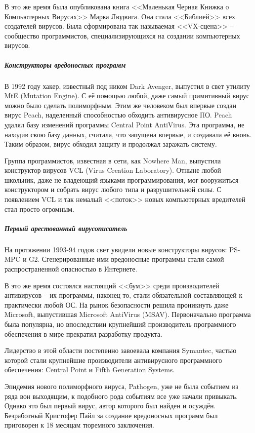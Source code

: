 В это же время была опубликована книга <<Маленькая Черная Книжка о
Компьютерных Вирусах>> Марка Людвига. Она стала <<Библией>> всех создателей
вирусов. Была сформирована так называемая <<VX-сцена>> – сообщество
программистов, специализирующихся на создании компьютерных вирусов.

%
\subparagraph{Конструкторы вредоносных программ}
%
В 1992 году хакер, известный под ником Dark Avenger, выпустил в свет утилиту
MtE (Mutation Engine). С её помощью любой, даже самый примитивный вирус можно
было сделать полиморфным. Этим же человеком был впервые создан вирус Peach,
наделенный способностью обходить антивирусное ПО. Peach удалял базу изменений
программы Central Point AntiVirus. Эта программа, не находив свою базу
данных, считала, что запущена впервые, и создавала её вновь. Таким образом,
вирус обходил защиту и продолжал заражать систему.

Группа программистов, известная в сети, как Nowhere Man, выпустила
конструктор вирусов VCL (Virus Creation Laboratory). Отныне любой школьник,
даже не владеющий языками программирования, мог вооружиться конструктором и
собрать вирус любого типа и разрушительной силы. С появлением VCL и так
немалый <<поток>> новых компьютерных вредителей стал просто огромным.
%
\subparagraph{Первый арестованный вирусописатель}

На протяжении 1993-94 годов свет увидели новые конструкторы вирусов: PS-MPC и
G2. Сгенерированные ими вредоносные программы стали самой распространенной
опасностью в Интернете.

В это же время состоялся настоящий <<бум>> среди производителей антивирусов –
их программы, наконец-то, стали обязательной составляющей к практически любой
ОС. На рынок безопасности решила проникнуть даже Microsoft, выпустившая
Microsoft AntiVirus (MSAV). Первоначально программа была популярна, но
впоследствии крупнейший производитель программного обеспечения в мире
прекратил разработку продукта.

Лидерство в этой области постепенно завоевала компания Symantec, частью
которой стали крупнейшие производители антивирусного программного
обеспечения: Central Point и Fifth Generation Systems.

Эпидемия нового полиморфного вируса, Pathogen, уже не была событием из ряда
вон выходящим, к подобного рода событиям все уже начали привыкать. Однако это
был первый вирус, автор которого был найден и осуждён. Безработный Кристофер
Пайл за создание вредоносных программ был приговорен к 18 месяцам тюремного
заключения.

